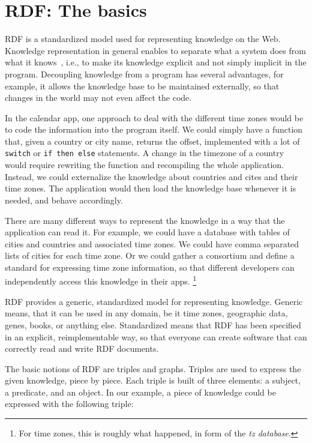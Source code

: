 \section{RDF: The basics}
\label{rdf}

RDF is a standardized model used for representing knowledge on the Web.
Knowledge representation in general enables to separate what a system does from what it knows~\cite{brachmannKR}, i.e., to make its knowledge explicit and not simply implicit in the program.
Decoupling knowledge from a program has several advantages, for example, it allows the knowledge base to be maintained externally, so that changes in the world may not even affect the code.

In the calendar app, one approach to deal with the different time zones would be to code the information into the program itself. 
We could simply have a function that, given a country or city name, returns the offset, implemented with a lot of \texttt{switch} or \texttt{if then else} statements.
A change in the timezone of a country would require rewriting the function and recompiling the whole application.
Instead, we could externalize the knowledge about countries and cites and their time zones.
The application would then load the knowledge base whenever it is needed, and behave accordingly.

There are many different ways to represent the knowledge in a way that the application can read it.
For example, we could have a database with tables of cities and countries and associated time zones.
We could have comma separated lists of cities for each time zone.
Or we could gather a consortium and define a standard for expressing time zone information, so that different developers can independently access this knowledge in their apps.%
\footnote{For time zones, this is roughly what happened, in form of the \textit{tz database}.}

RDF provides a generic, standardized model for representing knowledge.
Generic means, that it can be used in any domain, be it time zones, geographic data, genes, books, or anything else.
Standardized means that RDF has been specified in an explicit, reimplementable way, so that everyone can create software that can correctly read and write RDF documents.

The basic notions of RDF are triples and graphs.
Triples are used to express the given knowledge, piece by piece.
Each triple is built of three elements: a subject, a predicate, and an object.
In our example, a piece of knowledge could be expressed with the following triple:

